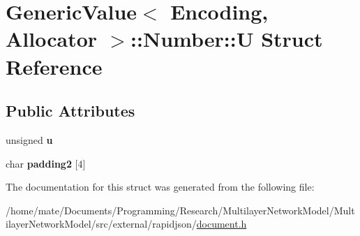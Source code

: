 \hypertarget{structGenericValue_1_1Number_1_1U}{}\section{Generic\+Value$<$ Encoding, Allocator $>$\+:\+:Number\+:\+:U Struct Reference}
\label{structGenericValue_1_1Number_1_1U}
\subsection*{Public Attributes}
\begin{DoxyCompactItemize}
\item 
unsigned {\bfseries u}\hypertarget{structGenericValue_1_1Number_1_1U_a175e3a2bd43e6880791eb7c950d2f147}{}\label{structGenericValue_1_1Number_1_1U_a175e3a2bd43e6880791eb7c950d2f147}

\item 
char {\bfseries padding2} \mbox{[}4\mbox{]}\hypertarget{structGenericValue_1_1Number_1_1U_a9341f65c1645f24fd001a1ebf58d3c5b}{}\label{structGenericValue_1_1Number_1_1U_a9341f65c1645f24fd001a1ebf58d3c5b}

\end{DoxyCompactItemize}


The documentation for this struct was generated from the following file\+:\begin{DoxyCompactItemize}
\item 
/home/mate/\+Documents/\+Programming/\+Research/\+Multilayer\+Network\+Model/\+Multilayer\+Network\+Model/src/external/rapidjson/\hyperlink{document_8h}{document.\+h}\end{DoxyCompactItemize}
